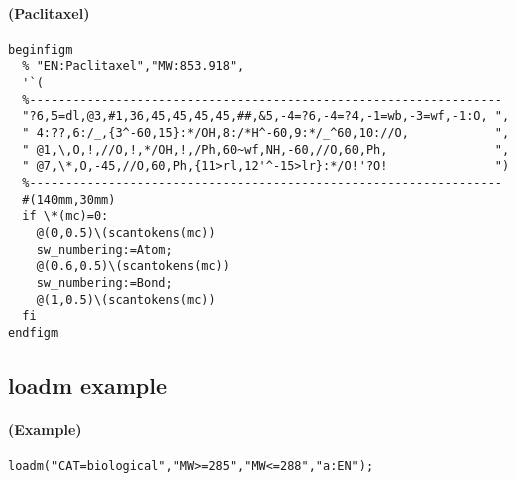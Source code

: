 \documentclass[a4paper]{article}
\begin{document}
\paragraph{(Paclitaxel)}
\noindent%
\begin{verbatim}
beginfigm
  % "EN:Paclitaxel","MW:853.918",
  '`(
  %------------------------------------------------------------------
  "?6,5=dl,@3,#1,36,45,45,45,45,##,&5,-4=?6,-4=?4,-1=wb,-3=wf,-1:O, ",
  " 4:??,6:/_,{3^-60,15}:*/OH,8:/*H^-60,9:*/_^60,10://O,            ",
  " @1,\,O,!,//O,!,*/OH,!,/Ph,60~wf,NH,-60,//O,60,Ph,               ",
  " @7,\*,O,-45,//O,60,Ph,{11>rl,12'^-15>lr}:*/O!'?O!               ")
  %------------------------------------------------------------------
  #(140mm,30mm)
  if \*(mc)=0:
    @(0,0.5)\(scantokens(mc))
    sw_numbering:=Atom;
    @(0.6,0.5)\(scantokens(mc))
    sw_numbering:=Bond;
    @(1,0.5)\(scantokens(mc))
  fi
endfigm
\end{verbatim}
\noindent%
\newpage
\subsection{loadm example}
%
%
\paragraph{(Example)}
\begin{verbatim}
loadm("CAT=biological","MW>=285","MW<=288","a:EN");
\end{verbatim}
\end{document}
